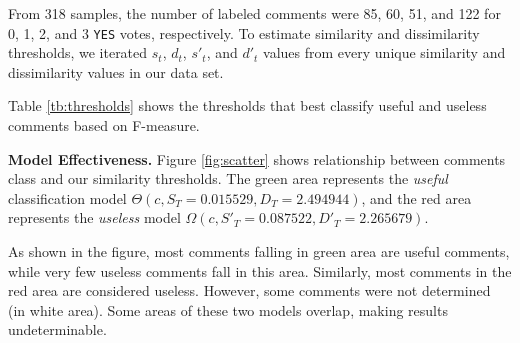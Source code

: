 
%

From 318 samples, the number of labeled comments were 85, 60, 51, and 122 for 0, 1, 2, and 3 \texttt{YES} votes, respectively.
To estimate similarity and dissimilarity thresholds, we iterated $s_t$, $d_t$, $s'_t$, and $d'_t$ values from every unique similarity and dissimilarity values in our data set.
  
Table \ref{tb:thresholds} shows the thresholds that best classify useful and useless comments based on F-measure.

\textbf{Model Effectiveness.}
Figure \ref{fig:scatter} shows relationship between comments class and our similarity thresholds.
The green area represents the \emph{useful} classification model $\Theta(c,S_T=0.015529,D_T=2.494944)$, and the red area represents the \emph{useless} model $\Omega(c,S'_T=0.087522,D'_T=2.265679)$.


As shown in the figure, most comments falling in green area are useful comments, while very few useless comments fall in this area.
Similarly, most comments in the red area are considered useless.
However, some comments were not determined (in white area).
Some areas of these two models overlap, making results undeterminable.

